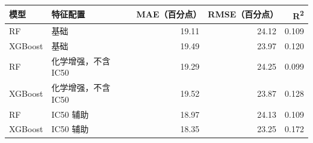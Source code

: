 \begin{tabular}{llrrr}
\toprule
模型 & 特征配置 & MAE（百分点） & RMSE（百分点） & R\textsuperscript{2} \\
\midrule
RF & 基础 & 19.11 & 24.12 & 0.109 \\
XGBoost & 基础 & 19.49 & 23.97 & 0.120 \\
RF & 化学增强，不含 IC50 & 19.29 & 24.25 & 0.099 \\
XGBoost & 化学增强，不含 IC50 & 19.52 & 23.87 & 0.128 \\
RF & IC50 辅助 & 18.97 & 24.13 & 0.109 \\
XGBoost & IC50 辅助 & 18.35 & 23.25 & 0.172 \\
\bottomrule
\end{tabular}
